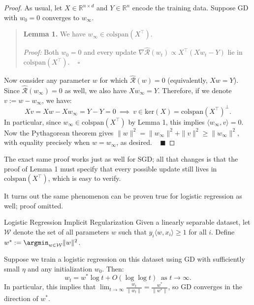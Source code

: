\begin{proof}
    As usual, let $X \in \mathbb{R}^{n \times d}$ and $Y \in \mathbb{R}^n$
    encode the training data.
    Suppose GD with $w_0 = 0$ converges to $w_{\infty}$.
    \begin{quote}
        \textbf{Lemma 1.}
        We have $w_{\infty} \in \mathrm{colspan}(X^{\top})$.

        \emph{Proof:}
        Both $w_0 = 0$ and every update $\nabla \hat{\mathcal{R}}(w_t)
        \propto X^{\top}(Xw_t - Y)$
        lie in $\mathrm{colspan}(X^{\top})$. ~ $\square$
    \end{quote}
    Now consider any parameter $w$ for which
    $\hat{\mathcal{R}}(w) = 0$ (equivalently, $Xw = Y$).
    Since $\hat{\mathcal{R}}(w_{\infty}) = 0$ as well,
    we also have $Xw_{\infty} = Y$.
    Therefore, if we denote $v := w - w_{\infty}$, we have:
    \[ Xv = Xw - Xw_{\infty} = Y - Y = 0
    ~ \implies ~
    v \in \mathrm{ker}(X) = \mathrm{colspan}(X^{\top})^{\perp}. \]
    In particular, since $w_{\infty} \in \mathrm{colspan}(X^{\top})$
    by Lemma 1, this implies $\langle w_{\infty}, v \rangle = 0$.
    Now the Pythagorean theorem gives
    $\|w\|^2 = \|w_{\infty}\|^2 + \|v\|^2 \geq \|w_{\infty}\|^2$,
    with equality precisely when $w = w_{\infty}$,
    as desired. ~ $\blacksquare$
\end{proof}

\begin{remark}
    The exact same proof works just as well for SGD;
    all that changes is that the proof of Lemma 1
    must specify that every possible update
    still lives in $\mathrm{colspan}(X^{\top})$,
    which is easy to verify.
\end{remark}

It turns out the same phenomenon
can be proven true for logistic regression as well;
proof omitted.

\begin{theorem}{Logistic Regression Implicit Regularization}
    Given a linearly separable dataset,
    let $\mathcal{W}$ denote the set of all parameters
    $w$ such that $y_i \langle w, x_i \rangle \geq 1$ for all $i$.
    Define $w^* := \argmin_{w \in \mathcal{W}} \|w\|^2$.

    Suppose we train a logistic regression on this dataset using GD
    with sufficiently small $\eta$ and any initialization $w_0$.  Then:
    \[ w_t = w^* \log t + O(\log \log t)
    ~ \text{ as } t \to \infty. \]
    In particular, this implies that
    $\lim_{t \to \infty} \frac{w_t}{\|w_t\|} = \frac{w^*}{\|w^*\|}$,
    so GD converges in the direction of $w^*$.
\end{theorem}

